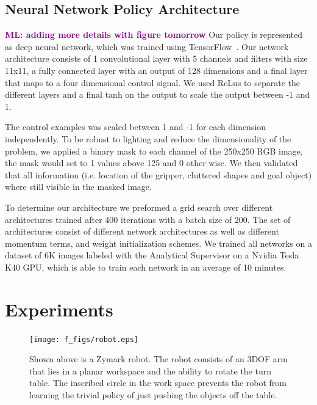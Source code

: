 \documentclass[10pt, conference]{ieeeconf}      %
\newcommand{\mlnote}[1]{\ifthenelse{ \boolean{include-notes}}%
 {\textcolor{purple}{\textbf{ML: #1}}}{}}
\begin{document}
\subsection{Neural Network Policy Architecture}
\mlnote{adding more details with figure tomorrow}
Our policy is represented as deep neural network, which was trained using TensorFlow~\cite{tensorflow2015-whitepaper}. Our network architecture consists of 1 convolutional layer with 5 channels and filters with size 11x11, a fully connected layer with an output of 128 dimensions and a final layer that maps to a four dimensional control signal. We used ReLus to separate the different layers and a final tanh on the output to scale the output between -1 and 1. 

The control examples was scaled between 1 and -1 for each dimension independently. To be robust to lighting and reduce the dimensionality of the problem, we applied a binary mask to each channel of the 250x250 RGB image, the mask would set to 1 values above 125 and 0 other wise.  We then validated that all information (i.e. location of the gripper, cluttered shapes and goal object) where still visible in the masked image. 

To determine our architecture we preformed a grid search over different architectures  trained after 400 iterations with a batch size of 200. The set of architectures consist of different network architectures as well as different momentum terms, and weight initialization schemes. We trained all networks on a dataset of 6K images labeled with the Analytical Supervisor on a Nvidia Tesla K40 GPU, which is able to train each network in an average of 10 minutes.  


\section{Experiments} \label{sec:Exp}
\begin{figure}[t]
\centering

\texttt{[image: f\_figs/robot.eps]}

\caption{\footnotesize  Shown above is a Zymark robot. The robot consists of an 3DOF arm that lies in a planar workspace and the ability to rotate the turn table. The inscribed circle in the work space prevents the robot from learning the trivial policy of just pushing the objects off the table.}

\label{fig:robot}
\end{figure}
\end{document}
